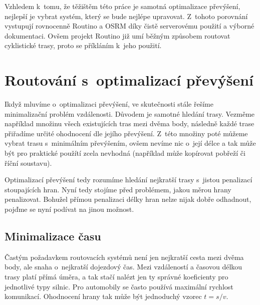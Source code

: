 \documentclass[thesis=B,czech]{FITthesis}[2012/06/26]
\begin{document}
Vzhledem k~tomu, že těžištěm této práce je samotná optimalizace převýšení, nejlepší je vybrat systém, který se bude nejlépe upravovat. Z~tohoto porovnání vystupují rovnocenně Routino a OSRM díky čistě serverovému použití a výborné dokumentaci. Ovšem projekt Routino již umí běžným způsobem routovat cyklistické trasy, proto se příkláním k~jeho použití.




























\chapter{Routování s~optimalizací převýšení}
\label{routovani}

Ikdyž mluvíme o~optimalizaci převýšení, ve skutečnosti stále řešíme minimalizační problém vzdálenosti. Důvodem je samotné hledání trasy. Vezměme například množinu všech existujících tras mezi dvěma body, následně každé trase přiřadíme určité ohodnocení dle jejího převýšení. Z~této množiny poté můžeme vybrat trasu s~minimálním převýšením, ovšem nevíme nic o~její délce a tak může být pro praktické použítí zcela nevhodná (například může kopírovat pobřeží či říční soustavu).

Optimalizací převýšení tedy rozumíme hledání nejkratší trasy s~jistou penalizací stoupajících hran. Nyní tedy stojíme před problémem, jakou měrou hrany penalizovat. Bohužel přímou penalizaci délky hran nelze nijak dobře odhadnout, pojďme se nyní podívat na jinou možnost.

\section{Minimalizace času} \label{minimalizace-casu}
Častým požadavkem routovacích systémů není jen nejkratší cesta mezi dvěma body, ale snaha o~nejkratší dojezdový čas. Mezi vzdáleností a časovou délkou trasy platí přímá úměra, a tak stačí nalézt jen ty správné koeficienty pro jednotlivé typy silnic. Pro automobily se často používá maximální rychlost komunikací. Ohodnocení hrany tak může být jednoduchý vzorec $t=s / v$. 
\end{document}
